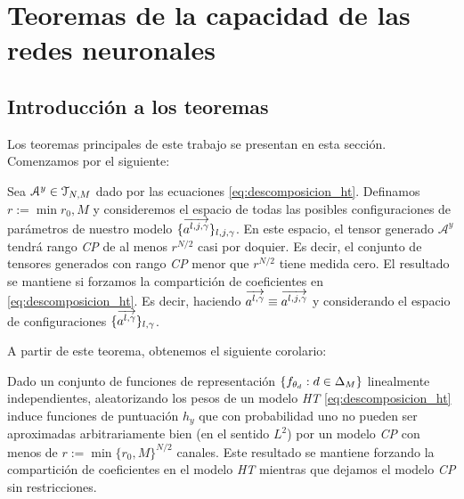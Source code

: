 \chapter{Teoremas de la capacidad de las redes neuronales}

\section{Introducción a los teoremas}

Los teoremas principales de este trabajo se presentan en esta sección. Comenzamos por el siguiente:

\begin{teorema}

Sea $\mathcal{A}^y \in \mathcal{T}_{N, M}$ dado por las ecuaciones \eqref{eq:descomposicion_ht}. Definamos $r := \min{r_0, M}$ y consideremos el espacio de todas las posibles configuraciones de parámetros de nuestro modelo $\{ \overrightarrow{a^{l, j, \gamma}} \}_{l, j, \gamma}$. En este espacio, el tensor generado $\mathcal{A}^y$ tendrá rango \textit{CP} de al menos $r^{N/2}$ casi por doquier. Es decir, el conjunto de tensores generados con rango \textit{CP} menor que $r^{N/2}$ tiene medida cero. El resultado se mantiene si forzamos la compartición de coeficientes en \eqref{eq:descomposicion_ht}. Es decir, haciendo $\overrightarrow{a^{l, \gamma}} \equiv \overrightarrow{a^{l, j, \gamma}}$ y considerando el espacio de configuraciones $\{ \overrightarrow{a^{l, \gamma}}  \}_{l, \gamma}$.

\end{teorema}

A partir de este teorema, obtenemos el siguiente corolario:

\begin{corolario} \label{corol:corol_principal}

Dado un conjunto de funciones de representación $\{f_{\theta_d}: d \in \Delta_{M} \}$ linealmente independientes, aleatorizando los pesos de un modelo \textit{HT} \eqref{eq:descomposicion_ht} induce funciones de puntuación $h_y$ que con probabilidad uno no pueden ser aproximadas arbitrariamente bien (en el sentido $L^2$) por un modelo \textit{CP} con menos de $r := \min \{r_0, M \}^{N/2}$ canales. Este resultado se mantiene forzando la compartición de coeficientes en el modelo \textit{HT} mientras que dejamos el modelo \textit{CP} sin restricciones.

\end{corolario}

